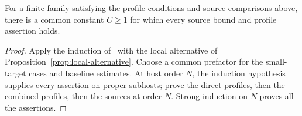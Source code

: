 \begin{proposition}\label{prop:joint-construction}
For a finite family satisfying the profile conditions and source comparisons
above, there is a common constant $C\ge1$ for which every source bound and
profile assertion holds.
\end{proposition}
\begin{proof}
Apply the induction of~\cite[Theorem~5.7]{ZBS} with the local alternative
of Proposition~\ref{prop:local-alternative}.
Choose a common prefactor for the small-target cases
and baseline estimates. At host order $N$, the induction hypothesis
supplies every assertion on proper subhosts; prove the direct profiles,
then the combined profiles, then the sources at order $N$.
Strong induction on $N$ proves all the assertions.
\end{proof}
